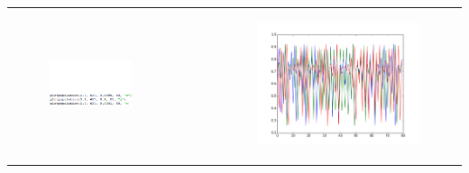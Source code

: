 \documentclass[ignorenonframetext]{beamer}
\begin{document}
\begin{frame}
\begin{tabular}{cr}
\\\begin{minipage}{0.4\textwidth}
\begin{figure}[htbp]
\includegraphics[width = \textwidth]{population-development2-code}
\end{figure}
\end{minipage}

&\begin{minipage}[t]{0.6\textwidth}
\begin{figure}[htbp]
\vspace*{-45pt}
\includegraphics[width = 0.8\textwidth]{population-development2}
\end{figure}
\end{minipage}
\end{tabular}
\end{frame}
\end{document}
